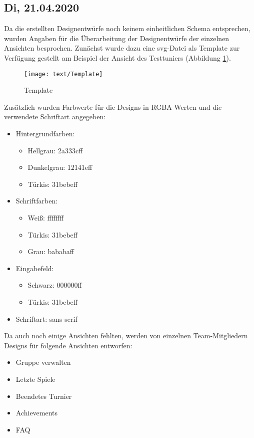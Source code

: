 \subsection{Di, 21.04.2020}
Da die erstellten Designentwürfe noch keinem einheitlichen Schema entsprechen, wurden Angaben für die Überarbeitung der Designentwürfe der einzelnen Ansichten besprochen.
Zunächst wurde dazu eine svg-Datei als Template zur Verfügung gestellt am Beispiel der Ansicht des Testtuniers (Abbildung \ref{template}).\\
\begin{figure}[h!]
	\centering
	\texttt{[image: text/Template]}
	\caption{Template}
	\label{template}
\end{figure}
Zusätzlich wurden Farbwerte für die Designs in RGBA-Werten und die verwendete Schriftart angegeben:
\begin{itemize}
	\item Hintergrundfarben:
	\begin{itemize}
		\item Hellgrau: 2a333cff
		\item Dunkelgrau: 12141eff
		\item Türkis: 31bebeff
	\end{itemize}
	\item Schriftfarben:
	\begin{itemize}
		\item Weiß: ffffffff
		\item Türkis: 31bebeff
		\item Grau: bababaff
	\end{itemize}
	\item Eingabefeld:
	\begin{itemize}
		\item Schwarz: 000000ff
		\item Türkis: 31bebeff
	\end{itemize}
	\item Schriftart: sans-serif
\end{itemize}
Da auch noch einige Ansichten fehlten, werden von einzelnen Team-Mitgliedern Designs für folgende Ansichten entworfen:
\begin{itemize}
	\item Gruppe verwalten
	\item Letzte Spiele
	\item Beendetes Turnier
	\item Achievements
	\item FAQ
\end{itemize}
